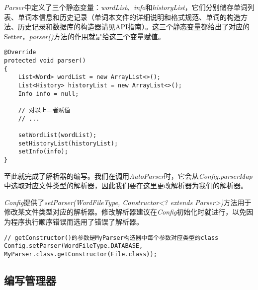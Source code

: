 \emph{Parser}中定义了三个静态变量：\emph{wordList}、\emph{info}和\emph{historyList}，它们分别储存单词列表、单词本信息和历史记录（单词本文件的详细说明和格式规范、单词的构造方法、历史记录和数据库的构造器请见API指南）。这三个静态变量都给出了对应的Setter，\emph{parser()}方法的作用就是给这三个变量赋值。

\begin{lstlisting}[style=Java, caption={parser方法},label={lst:parser方法}]
@Override
protected void parser()
{
    List<Word> wordList = new ArrayList<>();
    List<History> historyList = new ArrayList<>();
    Info info = null;

    // 对以上三者赋值
    // ...

    setWordList(wordList);
    setHistoryList(historyList);
    setInfo(info);
}
\end{lstlisting}

至此就完成了解析器的编写。我们在调用\emph{AutoParser}时，它会从\emph{Config.parserMap}中选取对应文件类型的解析器，因此我们要在这里更改解析器为我们的解析器。

\emph{Config}提供了\emph{setParser(WordFileType, Constructor<? extends Parser>)}方法用于修改某文件类型对应的解析器。修改解析器建议在\emph{Config}初始化时就进行，以免因为程序执行顺序错误而选用了错误了解析器。

\begin{lstlisting}[style=Java, caption={修改解析器},label={lst:修改解析器}]
// getConstructor()的参数是MyParser构造器中每个参数对应类型的class
Config.setParser(WordFileType.DATABASE, MyParser.class.getConstructor(File.class));
\end{lstlisting}

\subsection[管理器]{编写管理器}\label{subsec:管理器}
